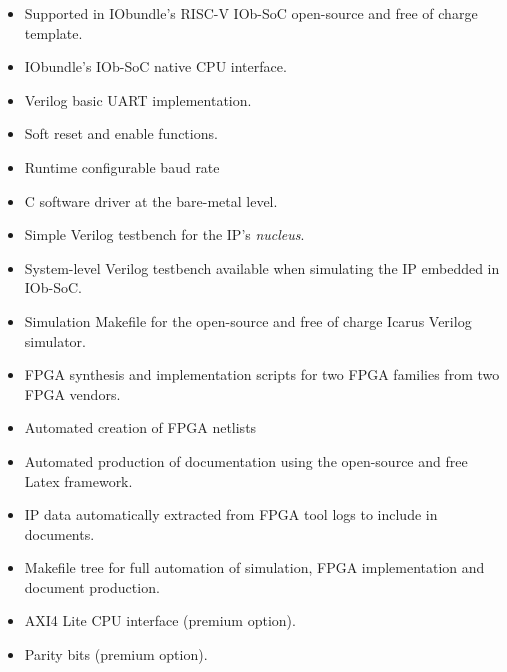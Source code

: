 %

\begin{itemize}
\item Supported in IObundle's RISC-V IOb-SoC open-source and free of charge template.
\item IObundle's IOb-SoC native CPU interface.
\item Verilog basic UART implementation.
\item Soft reset and enable functions.
\item Runtime configurable baud rate
\item C software driver at the bare-metal level.
\item Simple Verilog testbench for the IP's {\em nucleus}.
\item System-level Verilog testbench available when simulating the IP embedded in IOb-SoC.
\item Simulation Makefile for the open-source and free of charge Icarus Verilog simulator.
\item FPGA synthesis and implementation scripts for two FPGA families from two FPGA vendors.
\item Automated creation of FPGA netlists
\item Automated production of documentation using the open-source and free Latex framework.
\item IP data automatically extracted from FPGA tool logs to include in documents.
\item Makefile tree for full automation of simulation, FPGA implementation and document production.
\item AXI4 Lite CPU interface (premium option).
\item Parity bits  (premium option).
\end{itemize}
